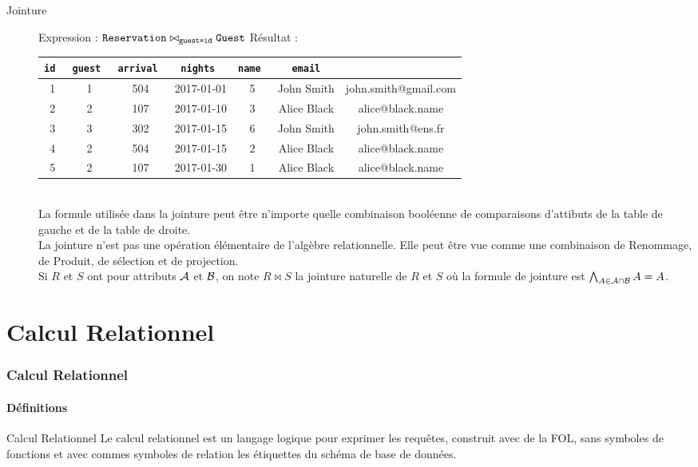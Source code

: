 \documentclass{cours}
\begin{document}
\begin{description}
    \item[Jointure] Expression : $\texttt{Reservation} \bowtie_{\texttt{guest=id}} \texttt{Guest}$
    Résultat : \\
    \begin{tabular}{ccccccc}
        \toprule
        \tt id & \tt guest & \tt arrival & \tt nights & \tt name & \tt email\\
        \midrule
        1 & 1 & 504 & 2017-01-01 & 5 & John Smith & john.smith@gmail.com\\
        2 & 2 & 107 & 2017-01-10 & 3 & Alice Black & alice@black.name\\
        3 & 3 & 302 & 2017-01-15 & 6 & John Smith & john.smith@ens.fr\\
        4 & 2 & 504 & 2017-01-15 & 2 & Alice Black & alice@black.name\\
        5 & 2 & 107 & 2017-01-30 & 1 & Alice Black & alice@black.name\\
        \bottomrule
    \end{tabular}\\
    La formule utilisée dans la jointure peut être n'importe quelle combinaison booléenne de comparaisons d'attibuts de la table de gauche et de la table de droite. \\
    La jointure n'est pas une opération élémentaire de l'algèbre relationnelle. Elle peut être vue comme une combinaison de Renommage, de Produit, de sélection et de projection.\\
    Si $R$ et $S$ ont pour attributs $\mathcal{A}$ et $\mathcal{B}$, on note $R \bowtie S$ la jointure naturelle de $R$ et $S$ où la formule de jointure est $\bigwedge_{A \in \mathcal{A} \cap \mathcal{B}} A = A$.
\end{description}

\part{Calcul Relationnel}
\section{Calcul Relationnel}
\subsection{Définitions}
\begin{définition}{Calcul Relationnel}{}
    Le calcul relationnel est un langage logique pour exprimer les requêtes, construit avec de la FOL, sans symboles de fonctions et avec commes symboles de relation les étiquettes du schéma de base de données.
\end{définition}
\end{document}
